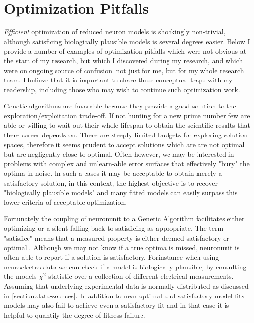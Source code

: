 \section{Optimization Pitfalls}
\emph{Efficient} optimization of reduced neuron models is shockingly non-trivial, although satisficing biologically plausible models is several degrees easier.
Below I provide a number of examples of optimization pitfalls which were not obvious at the start of my research, but which I discovered during my research, and which were on ongoing source of confusion, not just for me, but for my whole research team.
I believe that it is important to share these conceptual traps with my readership, including those who may wish to continue such optimization work.

Genetic algorithms are favorable because they provide a good solution to the exploration/exploitation trade-off. If not hunting for a new prime number few are able or willing to wait out their whole lifespan to obtain the scientific results that there career depends on. There are steeply limited budgets for exploring solution spaces, therefore it seems prudent to accept solutions which are are not optimal but are negligently close to optimal. Often however, we may be interested in problems with complex and unlearn-able error surfaces that effectively "bury" the optima in noise. In such a cases it may be acceptable to obtain merely a satisfactory solution, in this context, the highest objective is to recover "biologically plausible models" and many fitted models can easily surpass this lower criteria of acceptable optimization.

Fortunately the coupling of neuronunit to a Genetic Algorithm facilitates either optimizing or a silent falling back to satisficing as appropriate. The term "satisfice" means that a measured property is either deemed satisfactory or optimal \cite{simon1956rational}. Although we may not know if a true optima is missed, neuronunit is often able to report if a solution is satisfactory. Forinstance when using neuroelectro data we can check if a model is biologically plausible, by consulting the models $\chi^{2}$ statistic over a collection of different electrical measurements.  Assuming that underlying experimental data is normally distributed as discussed in \ref{section:data-sources}. In addition to near optimal and satisfactory model fits models may also fail to achieve even a satisfactory fit and in that case it is helpful to quantify the degree of fitness failure.



